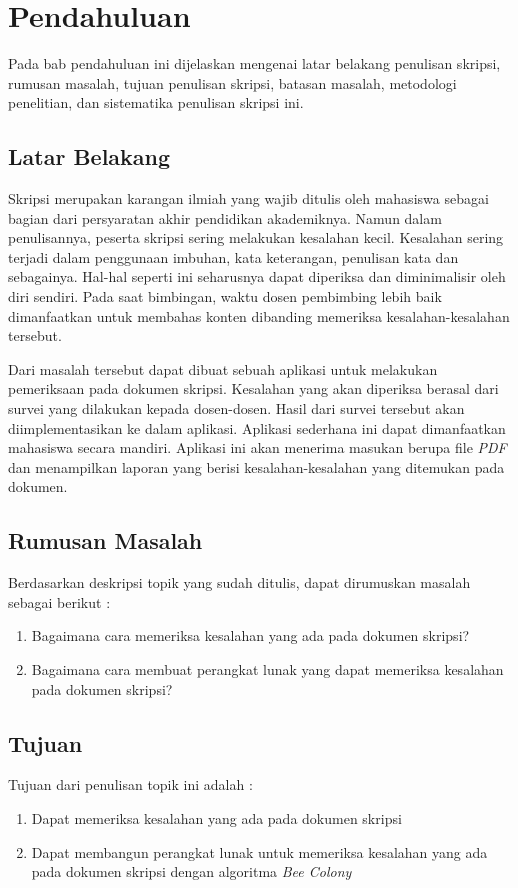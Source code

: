 \chapter{Pendahuluan}
\label{chap:intro}
   
Pada bab pendahuluan ini dijelaskan mengenai latar belakang penulisan skripsi, rumusan masalah, tujuan penulisan skripsi, batasan masalah, metodologi penelitian, dan sistematika penulisan skripsi ini.

\section{Latar Belakang}
\label{sec:label}

Skripsi merupakan karangan ilmiah yang wajib ditulis oleh mahasiswa sebagai bagian dari persyaratan akhir pendidikan akademiknya. Namun dalam penulisannya, peserta skripsi sering melakukan kesalahan kecil. Kesalahan sering terjadi dalam penggunaan imbuhan, kata keterangan, penulisan kata dan sebagainya. Hal-hal seperti ini seharusnya dapat diperiksa dan diminimalisir oleh diri sendiri. Pada saat bimbingan, waktu dosen pembimbing lebih baik dimanfaatkan untuk membahas konten dibanding memeriksa kesalahan-kesalahan tersebut.

Dari masalah tersebut dapat dibuat sebuah aplikasi untuk melakukan pemeriksaan pada dokumen skripsi. Kesalahan yang akan diperiksa berasal dari survei yang dilakukan kepada dosen-dosen. Hasil dari survei tersebut akan diimplementasikan ke dalam aplikasi. Aplikasi sederhana ini dapat dimanfaatkan mahasiswa secara mandiri. Aplikasi ini akan menerima masukan berupa file \textit{PDF} dan menampilkan laporan yang berisi kesalahan-kesalahan yang ditemukan pada dokumen.


\section{Rumusan Masalah}
\label{sec:rumusan}
Berdasarkan deskripsi topik yang sudah ditulis, dapat dirumuskan masalah sebagai berikut :
\begin{enumerate}
	\item Bagaimana cara memeriksa kesalahan yang ada pada dokumen skripsi?
	\item Bagaimana cara membuat perangkat lunak yang dapat memeriksa kesalahan pada dokumen skripsi?
\end{enumerate}

\section{Tujuan}
\label{sec:tujuan}
Tujuan dari penulisan topik ini adalah :
\begin{enumerate}
	\item Dapat memeriksa kesalahan yang ada pada dokumen skripsi
	\item Dapat membangun perangkat lunak untuk memeriksa kesalahan yang ada pada dokumen skripsi
dengan algoritma \textit{Bee Colony}
\end{enumerate}

